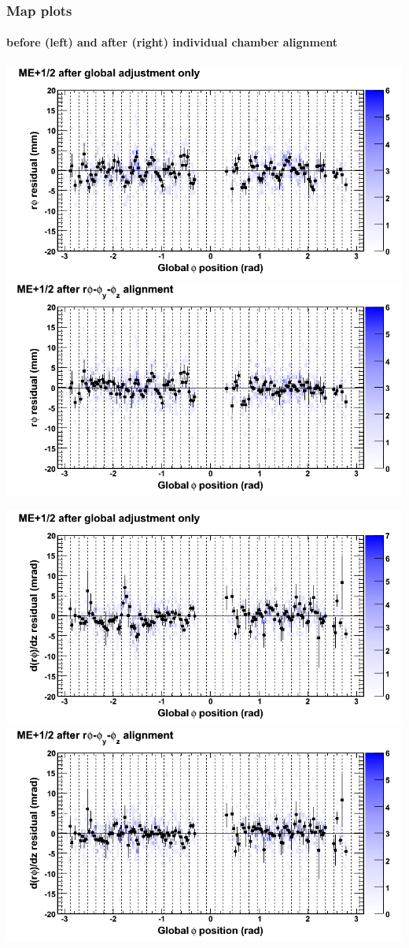\documentclass[compress]{beamer}
\begin{document}
\begin{frame}
\frametitle{Map plots}
\framesubtitle{before (left) and after (right) individual chamber alignment}
\includegraphics[width=0.5\linewidth]{ringmapplots_3dof/before_CSCvsphi_mep12_x.png} \includegraphics[width=0.5\linewidth]{ringmapplots_3dof/after_CSCvsphi_mep12_x.png}

\includegraphics[width=0.5\linewidth]{ringmapplots_3dof/before_CSCvsphi_mep12_dxdz.png} \includegraphics[width=0.5\linewidth]{ringmapplots_3dof/after_CSCvsphi_mep12_dxdz.png}
\end{frame}
\end{document}
